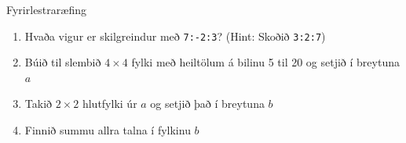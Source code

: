 \documentclass[handout]{beamer}
\begin{document}
\begin{frame}{Fyrirlestraræfing}
    \begin{enumerate}
        \item Hvaða vigur er skilgreindur með \texttt{7:-2:3}? (Hint: Skoðið \texttt{3:2:7})
        \item Búið til slembið $4 \times 4$ fylki með heiltölum á bilinu 5 til 20 og setjið í breytuna $a$
        \item Takið $2 \times 2$ hlutfylki úr $a$ og setjið það í breytuna $b$
        \item Finnið summu allra talna í fylkinu $b$
    \end{enumerate}
\end{frame}
\end{document}
